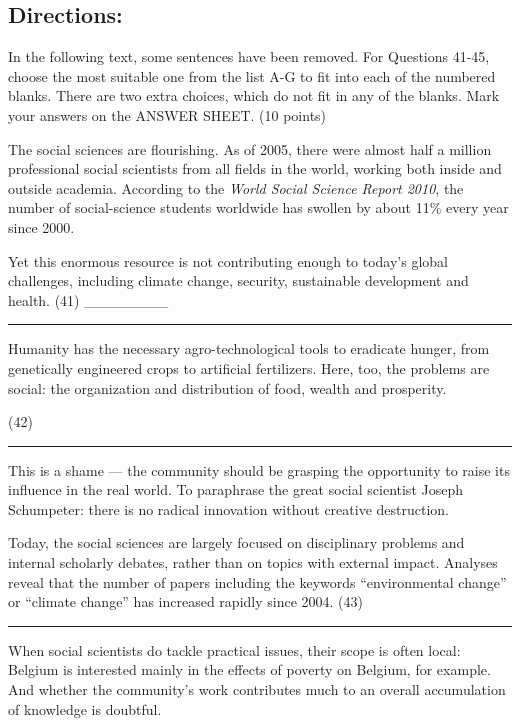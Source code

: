 \documentclass[UTF8,11pt]{ctexart}
\begin{document}
\subsection*{\textbf{Directions:}}


In the following text, some sentences have been removed. For Questions 41-45, choose the most suitable one from the list A-G to fit into each of the numbered blanks. There are two extra choices, which do not fit in any of the blanks. Mark your answers on the ANSWER SHEET. (10 points)


The social sciences are flourishing. As of 2005, there were almost half a million professional social scientists from all fields in the world, working both inside and outside academia. According to the \textit{World Social Science Report 2010}, the number of social-science students worldwide has swollen by about 11\% every year since 2000.


Yet this enormous resource is not contributing enough to today’s global challenges, including climate change, security, sustainable development and health. (41) \_\_\_\_\_\_\_\_ \par\noindent\rule{.95\linewidth}{.4pt}\par  Humanity has the necessary agro-technological tools to eradicate hunger, from genetically engineered crops to artificial fertilizers. Here, too, the problems are social: the organization and distribution of food, wealth and prosperity.


(42) \par\noindent\rule{.95\linewidth}{.4pt}\par  This is a shame — the community should be grasping the opportunity to raise its influence in the real world. To paraphrase the great social scientist Joseph Schumpeter: there is no radical innovation without creative destruction.


Today, the social sciences are largely focused on disciplinary problems and internal scholarly debates, rather than on topics with external impact. Analyses reveal that the number of papers including the keywords “environmental change” or “climate change” has increased rapidly since 2004. (43) \par\noindent\rule{.95\linewidth}{.4pt}\par


When social scientists do tackle practical issues, their scope is often local: Belgium is interested mainly in the effects of poverty on Belgium, for example. And whether the community’s work contributes much to an overall accumulation of knowledge is doubtful.
\end{document}
